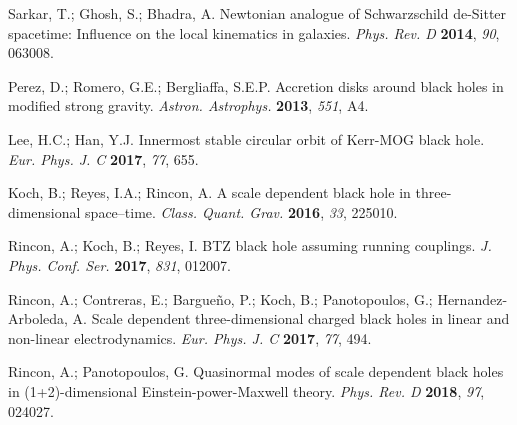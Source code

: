 \documentclass[aps,amsmath,amssymb,twocolumn]{revtex4}
\begin{document}
\begin{thebibliography}{999}
 Sarkar, T.; Ghosh, S.; Bhadra, A. 
Newtonian analogue of Schwarzschild de-Sitter spacetime: Influence on the local kinematics in galaxies.
\emph{Phys. Rev. D} \textbf{2014},   \emph{90}, 063008.

 Perez, D.; Romero, G.E.; Bergliaffa, S.E.P.  
Accretion disks around black holes in modified strong gravity.
\emph{Astron. Astrophys.} \textbf{2013},  \emph{551}, A4. 

 Lee, H.C.; Han, Y.J. 
  Innermost stable circular orbit of Kerr-MOG black hole.
  \emph{Eur. Phys. J. C}  \textbf{2017}, {\em 77},  655.





 Koch, B.; Reyes, I.A.; Rincon, A. 
A scale dependent black hole in three-dimensional space–time.
\emph{Class. Quant. Grav.} \textbf{2016}, \emph{33},  225010.

 Rincon, A.; Koch, B.; Reyes, I.  
BTZ black hole assuming running couplings.
\emph{J. Phys. Conf. Ser.}  \textbf{2017}, \emph{831}, 012007.
  
 Rincon, A.; Contreras, E.; Bargue{\~n}o, P.; Koch, B.; Panotopoulos, G.; Hernandez-Arboleda, A. 
Scale dependent three-dimensional charged black holes in linear and non-linear electrodynamics.
\emph{Eur. Phys. J. C} \textbf{2017},  \emph{77},  494.
  
 Rincon, A.; Panotopoulos, G. 
Quasinormal modes of scale dependent black holes in (1+2)-dimensional Einstein-power-Maxwell theory.
\emph{Phys. Rev. D} \textbf{2018}, \emph{97},  024027.
  

\end{thebibliography}
\end{document}
